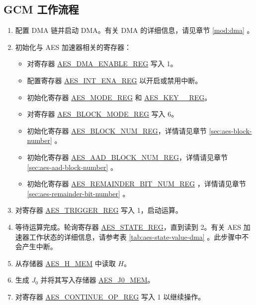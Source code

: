 \documentclass[main\_\_CN.tex]{subfiles}
\begin{document}
\subsection{GCM 工作流程}

\begin{enumerate}
    \item 配置 DMA 链并启动 DMA。有关 DMA 的详细信息，请见章节 \ref{mod:dma} \textit{}。
    \item 初始化与 AES 加速器相关的寄存器：
    \begin{itemize}
        \item 对寄存器 \hyperref[regdesc:AESDMAENABLEREG]{AES\_DMA\_ENABLE\_REG} 写入 1。
        \item 配置寄存器 \hyperref[regdesc:AESINTENAREG]{AES\_INT\_ENA\_REG} 以开启或禁用中断。
        \item 初始化寄存器  \hyperref[regdesc:AESMODEREG]{AES\_MODE\_REG} 和 \hyperref[regdesc:AESKEYnREG]{AES\_KEY\_\_REG}。
        \item 对寄存器 \hyperref[regdesc:AESBLOCKMODEREG]{AES\_BLOCK\_MODE\_REG} 写入 6。
        \item 初始化寄存器 \hyperref[regdesc:AESBLOCKNUMREG]{AES\_BLOCK\_NUM\_REG}，详情请见章节 \ref{sec:aes-block-number} \textit{}。
        \item 初始化寄存器 \hyperref[regdesc:AESAADBLOCKNUMREG]{AES\_AAD\_BLOCK\_NUM\_REG}，详情请见章节 \ref{sec:aes-aad-block-number} \textit{}。
        \item 初始化寄存器 \hyperref[regdesc:AESREMAINDERBITNUMREG]{AES\_REMAINDER\_BIT\_NUM\_REG} ，详情请见章节 \ref{sec:aes-remainder-bit-number} \textit{}。
    \end{itemize}
    \item 对寄存器 \hyperref[regdesc:AESTRIGGERREG]{AES\_TRIGGER\_REG} 写入 1，启动运算。
    \item 等待运算完成。轮询寄存器 \hyperref[regdesc:AESSTATEREG]{AES\_STATE\_REG}，直到读到 2。有关 AES 加速器工作状态的详细信息，请参考表 \ref{tab:aes-state-value-dma} \textit{}。此步骤中不会产生中断。
    \item 从存储器 \hyperref[memdesc:AESHMEM]{AES\_H\_MEM} 中读取 $H$。
    \item 生成 $J_0$ 并将其写入存储器 \hyperref[memdesc:AESJ0MEM]{AES\_J0\_MEM}。
    \item 对寄存器 \hyperref[regdesc:AESCONTINUEOPREG]{AES\_CONTINUE\_OP\_REG} 写入 1 以继续操作。

\end{enumerate}
\end{document}
